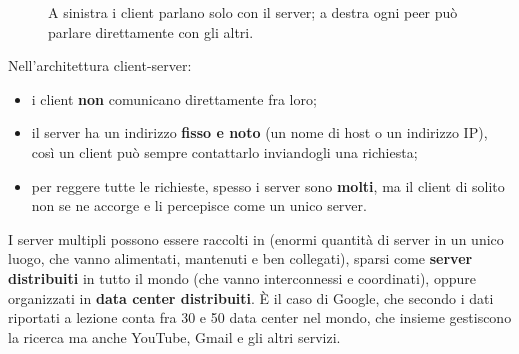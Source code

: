 \begin{figure}[H]
\centering
{}
\caption{A sinistra i client parlano solo con il server; a destra ogni peer può
         parlare direttamente con gli altri.}
\end{figure}

Nell'architettura client-server:

\begin{itemize}
  \item i client \textbf{non} comunicano direttamente fra loro;
  \item il server ha un indirizzo \textbf{fisso e noto} (un nome di host o un
        indirizzo IP), così un client può sempre contattarlo inviandogli una
        richiesta;
  \item per reggere tutte le richieste, spesso i server sono \textbf{molti}, ma
        il client di solito non se ne accorge e li percepisce come un unico
        server.
\end{itemize}

I server multipli possono essere raccolti in  (enormi
quantità di server in un unico luogo, che vanno alimentati, mantenuti e ben
collegati), sparsi come \textbf{server distribuiti} in tutto il mondo (che vanno
interconnessi e coordinati), oppure organizzati in \textbf{data center
distribuiti}. È il caso di Google, che secondo i dati riportati a lezione conta
fra 30 e 50 data center nel mondo, che insieme gestiscono la ricerca ma anche
YouTube, Gmail e gli altri servizi.

